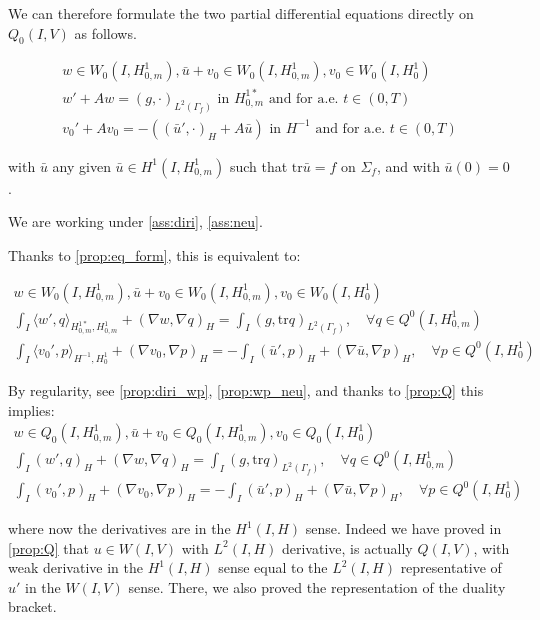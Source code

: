 \documentclass[english,a4paper,9pt,oneside]{scrbook}	%
\theoremstyle{break}
\theoremstyle{remark}
\newcommand{\tr}{\text{tr}}
\begin{document}
\begin{appendices}
We can therefore formulate the two partial differential equations directly on $Q_0(I,V)$ as follows.

\begin{align*}
w \in W_0(I, H^1_{0,m}),\bar{u}+v_0 \in W_0(I,H^1_{0,m}), v_0 \in W_0(I,H^1_0)\\
w' + A w = (g,\cdot)_{L^2(\Gamma_f)} \text{ in }H^{1*}_{0,m} \text{ and for a.e. } t \in (0,T) \\
v_0' + A v_0 = -((\bar{u}',\cdot)_H+A \bar{u}) \text{ in }H^{-1} \text{ and for a.e. } t \in (0,T) 
\end{align*}

with $\bar{u}$ any given $\bar{u}\in H^1(I,H^1_{0,m})$ such that $\tr \bar{u} =f$ on $\Sigma_f$, and with $\bar{u}(0)=0$.

We are working under \cref{ass:diri}, \cref{ass:neu}.

Thanks to \cref{prop:eq_form}, this is equivalent to:

\begin{align*}
w \in W_0(I, H^1_{0,m}), \bar{u}+v_0 \in W_0(I,H^1_{0,m}), v_0 \in W_0(I,H^1_0) \\
\int_I \langle w' , q\rangle_{H^{1*}_{0,m},H^1_{0,m}}+ (\nabla w, \nabla q)_H = \int_I(g,\tr q)_{L^2(\Gamma_f)}, \quad \forall q \in Q^0(I, H^1_{0,m}) \\
\int_I \langle v_0',p\rangle_{H^{-1},H^1_0} + (\nabla v_0, \nabla p)_H= -\int_I(\bar{u}',p)_H+(\nabla \bar{u}, \nabla p)_H, \quad \forall p \in Q^0(I, H^1_0) 
\end{align*}

By regularity, see \cref{prop:diri_wp}, \cref{prop:wp_neu}, and thanks to \cref{prop:Q} this implies:
\begin{align*}
w \in Q_0(I, H^1_{0,m}), \bar{u}+v_0 \in Q_0(I,H^1_{0,m}), v_0 \in Q_0(I,H^1_0) \\
\int_I ( w' , q)_H+ (\nabla w, \nabla q)_H = \int_I(g,\tr q)_{L^2(\Gamma_f)}, \quad \forall q \in Q^0(I, H^1_{0,m}) \\
\int_I (v_0',p)_H + (\nabla v_0, \nabla p)_H= -\int_I(\bar{u}',p)_H+(\nabla \bar{u}, \nabla p)_H, \quad \forall p \in Q^0(I, H^1_0) 
\end{align*}

where now the derivatives are in the $H^1(I,H)$ sense. Indeed we have proved in \cref{prop:Q} that $u \in W(I,V)$ with $L^2(I,H)$ derivative, is actually $Q(I,V)$, with weak derivative in the $H^1(I,H)$ sense equal to the $L^2(I,H)$ representative of $u'$ in the $W(I,V)$ sense. There, we also proved the representation of the duality bracket.


\end{appendices}
\end{document}
